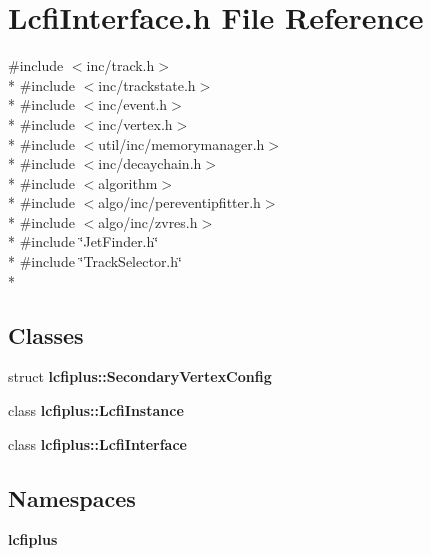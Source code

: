 \section{Lcfi\-Interface.\-h File Reference}
\label{LcfiInterface_8h}
{\ttfamily \#include $<$inc/track.\-h$>$}\\*
{\ttfamily \#include $<$inc/trackstate.\-h$>$}\\*
{\ttfamily \#include $<$inc/event.\-h$>$}\\*
{\ttfamily \#include $<$inc/vertex.\-h$>$}\\*
{\ttfamily \#include $<$util/inc/memorymanager.\-h$>$}\\*
{\ttfamily \#include $<$inc/decaychain.\-h$>$}\\*
{\ttfamily \#include $<$algorithm$>$}\\*
{\ttfamily \#include $<$algo/inc/pereventipfitter.\-h$>$}\\*
{\ttfamily \#include $<$algo/inc/zvres.\-h$>$}\\*
{\ttfamily \#include \char`\"{}Jet\-Finder.\-h\char`\"{}}\\*
{\ttfamily \#include \char`\"{}Track\-Selector.\-h\char`\"{}}\\*
\subsection*{Classes}
\begin{DoxyCompactItemize}
\item 
struct {\bf lcfiplus\-::\-Secondary\-Vertex\-Config}
\item 
class {\bf lcfiplus\-::\-Lcfi\-Instance}
\item 
class {\bf lcfiplus\-::\-Lcfi\-Interface}
\end{DoxyCompactItemize}
\subsection*{Namespaces}
\begin{DoxyCompactItemize}
\item 
{\bf lcfiplus}
\end{DoxyCompactItemize}
